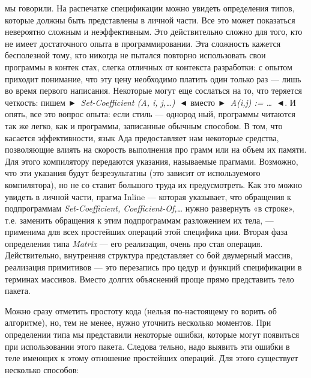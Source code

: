 мы говорили. На распечатке спецификации можно увидеть определения
типов, которые должны быть представлены в личной части.
Все это может показаться невероятно сложным и неэффективным.
Это действительно сложно для того, кто не имеет достаточного опыта
в программировании. Эта сложность кажется бесполезной тому, кто
никогда не пытался повторно использовать свои программы в контек­
стах, слегка отличных от контекста разработки: с опытом приходит
понимание, что эту цену необходимо платить один только раз — лишь
во время первого написания. Некоторые могут еще сослаться на то,
что теряется четкость: пишем \textit{►~Set-Coefficient (A, i, j,\dots)~◄} вместо
\textit{►~A(i,j) := \dots~◄}. И опять, все это вопрос опыта: если стиль — однород­
ный, программы читаются так же легко, как и программы, записанные
обычным способом.
В том, что касается эффективности, язык Ада предоставляет нам
некоторые средства, позволяющие влиять на скорость выполнения про­
грамм или на объем их памяти. Для этого компилятору передаются
указания, называемые прагмами. Возможно, что эти указания будут
безрезультатны (это зависит от используемого компилятора), но не со­
ставит большого труда их предусмотреть. Как это можно увидеть в
личной части, прагма Inline — которая указывает, что обращения к
подпрограммам \textit{Set-Coefficient, Coefficient-Of,\dots} нужно развернуть «в
строке», т.е. заменить обращения к этим подпрограммам разложением
их тела, — применима для всех простейших операций этой специфика­
ции.
Вторая фаза определения типа \textit{Matrix} — его реализация, очень про­
стая операция. Действительно, внутренняя структура представляет со­
бой двумерный массив, реализация примитивов — это перезапись про­
цедур и функций спецификации в терминах массивов. Вместо долгих
объяснений проще прямо представить тело пакета.

\newpage

Можно сразу отметить простоту кода (нельзя по-настоящему го­
	ворить об алгоритме), но, тем не менее, нужно уточнить несколько
моментов. При определении типа мы представили некоторые ошибки,
которые могут появиться при использовании этого пакета. Следова­
тельно, надо выявить эти ошибки в теле имеющих к этому отношение
простейших операций. Для этого существует несколько способов:


